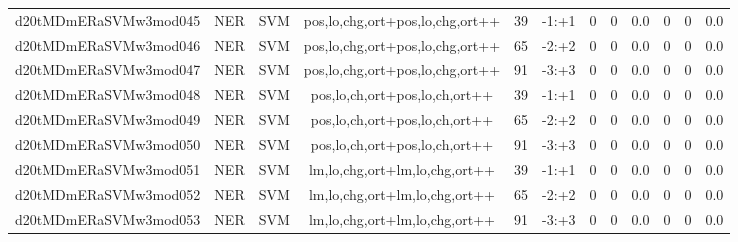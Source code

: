 \documentclass[a4paper]{article}
\begin{document}
\begin{landscape}
\begin{center}
\begin{tabular}{ |c|c|c|c|c|c|c|c|c|c|c|c|}
 
 	
 	\small{ d20tMDmERaSVMw3mod045 } & \small{ NER} & \small{  SVM }  & pos,lo,chg,ort+pos,lo,chg,ort++  &  39 &  \small{  -1:+1 }  &  0 & 0 & 0.0  &  0 & 0 & 0.0 \\
 	

 
 	
 	\small{ d20tMDmERaSVMw3mod046 } & \small{ NER} & \small{  SVM }  & pos,lo,chg,ort+pos,lo,chg,ort++  &  65 &  \small{  -2:+2 }  &  0 & 0 & 0.0  &  0 & 0 & 0.0 \\
 	

 
 	
 	\small{ d20tMDmERaSVMw3mod047 } & \small{ NER} & \small{  SVM }  & pos,lo,chg,ort+pos,lo,chg,ort++  &  91 &  \small{  -3:+3 }  &  0 & 0 & 0.0  &  0 & 0 & 0.0 \\
 	

 
 	
 	\small{ d20tMDmERaSVMw3mod048 } & \small{ NER} & \small{  SVM }  & pos,lo,ch,ort+pos,lo,ch,ort++  &  39 &  \small{  -1:+1 }  &  0 & 0 & 0.0  &  0 & 0 & 0.0 \\
 	

 
 	
 	\small{ d20tMDmERaSVMw3mod049 } & \small{ NER} & \small{  SVM }  & pos,lo,ch,ort+pos,lo,ch,ort++  &  65 &  \small{  -2:+2 }  &  0 & 0 & 0.0  &  0 & 0 & 0.0 \\
 	

 
 	
 	\small{ d20tMDmERaSVMw3mod050 } & \small{ NER} & \small{  SVM }  & pos,lo,ch,ort+pos,lo,ch,ort++  &  91 &  \small{  -3:+3 }  &  0 & 0 & 0.0  &  0 & 0 & 0.0 \\
 	

 
 	
 	\small{ d20tMDmERaSVMw3mod051 } & \small{ NER} & \small{  SVM }  & lm,lo,chg,ort+lm,lo,chg,ort++  &  39 &  \small{  -1:+1 }  &  0 & 0 & 0.0  &  0 & 0 & 0.0 \\
 	

 
 	
 	\small{ d20tMDmERaSVMw3mod052 } & \small{ NER} & \small{  SVM }  & lm,lo,chg,ort+lm,lo,chg,ort++  &  65 &  \small{  -2:+2 }  &  0 & 0 & 0.0  &  0 & 0 & 0.0 \\
 	

 
 	
 	\small{ d20tMDmERaSVMw3mod053 } & \small{ NER} & \small{  SVM }  & lm,lo,chg,ort+lm,lo,chg,ort++  &  91 &  \small{  -3:+3 }  &  0 & 0 & 0.0  &  0 & 0 & 0.0 \\
 	


\end{tabular}
\end{center}
\end{landscape}
\end{document}
